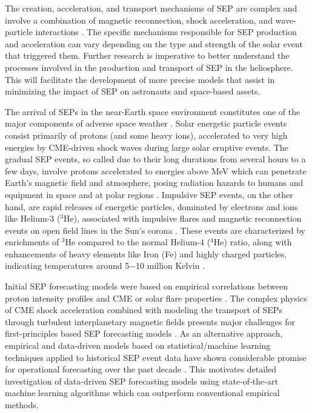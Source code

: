 The creation, acceleration, and transport mechanisms of SEP are complex and involve a combination of magnetic reconnection, shock acceleration, and wave-particle interactions \citep{li_2003, li_2012b, ng_2012}. The specific mechanisms responsible for SEP production and acceleration can vary depending on the type and strength of the solar event that triggered them. Further research is imperative to better understand the processes involved in the production and transport of SEP in the heliosphere. This will facilitate the development of more precise models that assist in minimizing the impact of SEP on astronauts and space-based assets.

The arrival of SEPs in the near-Earth space environment constitutes one of the major components of adverse space weather \citep{reames_1999, vainio_2009}. Solar energetic particle events consist primarily of protons (and some heavy ions), accelerated to very high energies by CME-driven shock waves during large solar eruptive events. The gradual SEP events, so called due to their long durations from several hours to a few days, involve protons accelerated to energies above  MeV which can penetrate Earth’s magnetic field and atmosphere, posing radiation hazards to humans and equipment in space and at polar regions \citep{reames_2013}.
Impulsive SEP events, on the other hand, are rapid releases of energetic particles, dominated by electrons and ions like Helium-3 ($^3$He), associated with impulsive flares and magnetic reconnection events on open field lines in the Sun's corona \citep{nitta_2015}. These events are characterized by enrichments of $^3$He compared to the normal Helium-4 ($^4$He) ratio, along with enhancements of heavy elements like Iron (Fe) and highly charged particles, indicating temperatures around 5$-$10 million Kelvin \citep{reames_2021}.

Initial SEP forecasting models were based on empirical correlations between proton intensity profiles and CME or solar flare properties \citep{kahler_2007}. The complex physics of CME shock acceleration combined with modeling the transport of SEPs through turbulent interplanetary magnetic fields presents major challenges for first-principles based SEP forecasting models \citep{aran_2006, laitinen_2017}. As an alternative approach, empirical and data-driven models based on statistical/machine learning techniques applied to historical SEP event data have shown considerable promise for operational forecasting over the past decade \citep{laurenza_2009, camporeale_2019, kozarev_2022}. This motivates detailed investigation of data-driven SEP forecasting models using state-of-the-art machine learning algorithms which can outperform conventional empirical methods.

